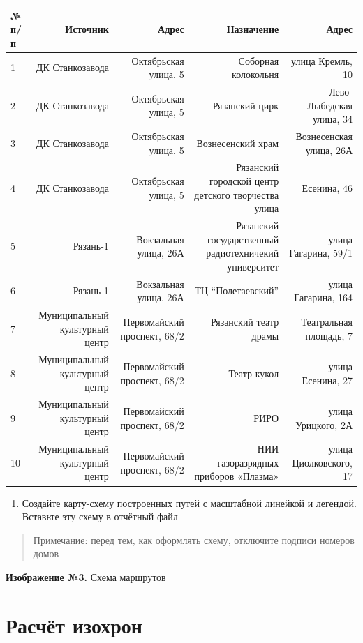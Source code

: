 \documentclass[
  12pt,
]{book}
\providecommand{\tightlist}{%
  \setlength{\itemsep}{0pt}\setlength{\parskip}{0pt}}
\begin{document}
\begin{longtable}[]{@{}lrrrr@{}}
\toprule()
№ п/п & Источник & Адрес & Назначение & Адрес \\
\midrule()
\endhead
1 & ДК Станкозавода & Октябрьская улица, 5 & Соборная колокольня & улица Кремль, 10 \\
2 & ДК Станкозавода & Октябрьская улица, 5 & Рязанский цирк & Лево-Лыбедская улица, 34 \\
3 & ДК Станкозавода & Октябрьская улица, 5 & Вознесенский храм & Вознесенская улица, 26А \\
4 & ДК Станкозавода & Октябрьская улица, 5 & Рязанский городской центр детского творчества улица & Есенина, 46 \\
5 & Рязань-1 & Вокзальная улица, 26А & Рязанский государственный радиотехничекий университет & улица Гагарина, 59/1 \\
6 & Рязань-1 & Вокзальная улица, 26А & ТЦ ``Полетаевский'' & улица Гагарина, 164 \\
7 & Муниципальный культурный центр & Первомайский проспект, 68/2 & Рязанский театр драмы & Театральная площадь, 7 \\
8 & Муниципальный культурный центр & Первомайский проспект, 68/2 & Театр кукол & улица Есенина, 27 \\
9 & Муниципальный культурный центр & Первомайский проспект, 68/2 & РИРО & улица Урицкого, 2А \\
10 & Муниципальный культурный центр & Первомайский проспект, 68/2 & НИИ газоразрядных приборов «Плазма» & улица Циолковского, 17 \\
\bottomrule()
\end{longtable}

\begin{enumerate}
\def\labelenumi{\arabic{enumi}.}
\setcounter{enumi}{17}
\tightlist
\item
  Создайте карту-схему построенных путей с масштабной линейкой и легендой. Вставьте эту схему в отчётный файл
\end{enumerate}

\begin{quote}
Примечание: перед тем, как оформлять схему, отключите подписи номеров домов
\end{quote}

\textbf{Изображение №3.} Схема маршрутов

\hypertarget{networks-isochrones}{%
\section{Расчёт изохрон}\label{networks-isochrones}}
\end{document}
